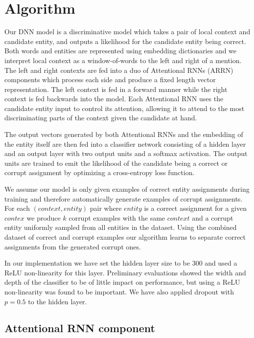 \documentclass[11pt]{article}
\begin{document}
\section{Algorithm}

Our DNN model is a discriminative model which takes a pair of local context and candidate entity, and outputs a likelihood for the candidate entity being correct. Both words and entities are represented using embedding dictionaries and we interpret local context as a window-of-words to the left and right of a mention. The left and right contexts are fed into a duo of Attentional RNNs (ARRN) components which process each side and produce a fixed length vector representation. The left context is fed in a forward manner while the right context is fed backwards into the model. Each Attentional RNN uses the candidate entity input to control its attention, allowing it to attend to the most discriminating parts of the context given the candidate at hand. 

The output vectors generated by both Attentional RNNs and the embedding of the entity itself are then fed into a classifier network consisting of a hidden layer and an output layer with two output units and a softmax activation. The output units are trained to emit the likelihood of the candidate being a correct or corrupt assignment by optimizing a cross-entropy loss function. 

We assume our model is only given examples of correct entity assignments during training and therefore automatically generate examples of corrupt assignments. For each $(context,entity)$ pair where $entity$ is a correct assignment for a given $contex$ we produce $k$ corrupt examples with the same $context$ and a corrupt entity uniformly sampled from all entities in the dataset. Using the combined dataset of correct and corrupt examples our algorithm learns to separate correct assignments from the generated corrupt ones.

In our implementation we have set the hidden layer size to be 300 and used a ReLU non-linearity for this layer. Preliminary evaluations showed the width and depth of the classifier to be of little impact on performance, but using a ReLU non-linearity was found to be important. We have also applied dropout with $p=0.5$ to the hidden layer.

\subsection{Attentional RNN component}
\end{document}
